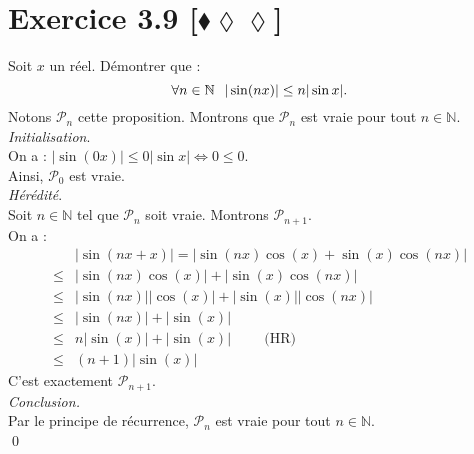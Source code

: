 \documentclass[10pt]{article}
\begin{document}

\section*{Exercice 3.9 [$\blacklozenge\lozenge\lozenge$]}
\begin{tcolorbox}[enhanced, width=6in, center, size=fbox, fontupper=\large, drop shadow southwest]
    Soit $x$ un réel. Démontrer que :
    \begin{equation*}
        \forall{n\in\mathbb{N}}\hspace{0.25cm} |\sin(nx)|\leq n|\sin x|.
    \end{equation*}
    Notons $\mathcal{P}_n$ cette proposition. Montrons que $\mathcal{P}_n$ est vraie pour tout $n\in\mathbb{N}$.\\
    \emph{Initialisation}.\\
    On a : $|\sin(0x)|\leq0|\sin x| \iff 0 \leq 0$.\\
    Ainsi, $\mathcal{P}_0$ est vraie.\\
    \emph{Hérédité}.\\
    Soit $n\in\mathbb{N}$ tel que $\mathcal{P}_n$ soit vraie. Montrons $\mathcal{P}_{n+1}$.\\
    On a :
    \begin{align*}
        &|\sin(nx+x)|=|\sin(nx)\cos(x)+\sin(x)\cos(nx)|\\
        \leq&|\sin(nx)\cos(x)|+|\sin(x)\cos(nx)|\\
        \leq&|\sin(nx)||\cos(x)|+|\sin(x)||\cos(nx)|\\
        \leq&|\sin(nx)|+|\sin(x)|\\
        \leq&n|\sin(x)|+|\sin(x)| \hspace{1cm}\text{(HR)}\\
        \leq&(n+1)|\sin(x)|
    \end{align*} 
    C'est exactement $\mathcal{P}_{n+1}$.\\
    \emph{Conclusion.}\\
    Par le principe de récurrence, $\mathcal{P}_n$ est vraie pour tout $n\in\mathbb{N}$.\\
    \qed
\end{tcolorbox}

\end{document}
